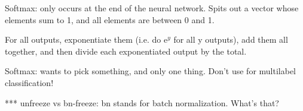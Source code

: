 \documentclass[12pt]{article}
\begin{document}
Softmax: only occurs at the end of the neural network. Spits out a vector whose elements sum to 1, and all elements are between 0 and 1.

For all outputs, exponentiate them (i.e. do e$^y$ for all y outputs), add them all together, and then divide each exponentiated output by the total.

Softmax: wants to pick something, and only one thing. Don't use for multilabel classification!



*** unfreeze vs bn-freeze: bn stands for batch normalization. What's that?
\end{document}
